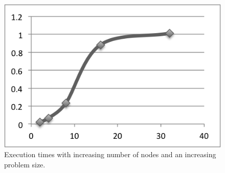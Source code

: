 \documentclass[a4paper]{article}
\begin{document}
\begin{figure}
  \centering
  \includegraphics{samescale.png}
  \caption{Execution times with increasing number of nodes and an increasing problem size.}
  \label{fig:fig3}
\end{figure}
  
\end{document}
